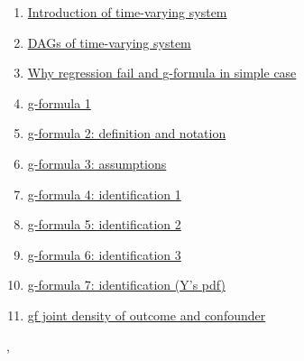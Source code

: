 \documentclass[11pt]{article}
\renewcommand{\today}{\shortmonthname[\the\month] \the \day,  \the\year}
\begin{document}
\begin{multicols}{2}
	\begin{enumerate}
		\item \href{https://mp.weixin.qq.com/s/RmfZv7W4_e6vWohTkAYGjg}{Introduction of time-varying system}	%
		\item \href{https://mp.weixin.qq.com/s/YJnn2hG_jsK-7BxGfgobTQ}{DAGs of time-varying system}	%
		\item \href{https://mp.weixin.qq.com/s/W7W-MO-VCpU92tYF73aqRQ}{\small Why regression fail and g-formula in simple case}	%
		\item \href{https://mp.weixin.qq.com/s/B3rAP8NRpz60hfU1PpgJ4A}{g-formula 1}	%
		\item \href{https://mp.weixin.qq.com/s/1UlKBo28nTVETec53cIn3Q}{g-formula 2: definition and notation}	%
		\item \href{https://mp.weixin.qq.com/s/nuRefZw7A7BsL10giGz__w}{g-formula 3: assumptions}	%
		\item \href{https://mp.weixin.qq.com/s/mJsF27jYbdXUu9gAlkhIFw}{g-formula 4: identification 1}	%
		\item \href{https://mp.weixin.qq.com/s/oe3ygsTkzY3s9sw3CgVDXw}{g-formula 5: identification 2}	%
		\item \href{https://mp.weixin.qq.com/s/GOce-aNrvnZz-zpeZJxTrg}{g-formula 6: identification 3}	%
		\item \href{https://mp.weixin.qq.com/s/ne_rbSLWPXV5hoGrySikrw}{g-formula 7: identification (Y's pdf)}	%
		\item \href{https://mp.weixin.qq.com/s/FUYsX3IZQLBjW-7yoI35Lw}{gf joint density of outcome and confounder}	%
	\end{enumerate}
\end{multicols}




%
\begin{flushright}
	\tiny \today 
\end{flushright}
\end{document}
